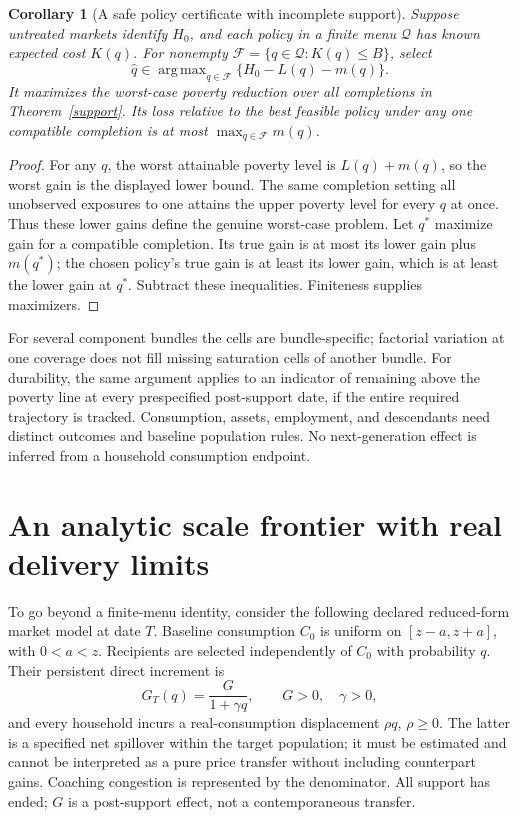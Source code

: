 \documentclass[11pt]{article}
\newtheorem{corollary}[theorem]{Corollary}
\theoremstyle{remark}
\DeclareMathOperator*{\argmax}{arg\,max}
\begin{document}
\begin{corollary}[A safe policy certificate with incomplete support]
Suppose untreated markets identify $H_0$, and each policy in a finite menu $\mathcal Q$ has known expected cost $K(q)$. For nonempty $\mathcal F=\{q\in\mathcal Q:K(q)\leq B\}$, select
\[
 \widehat q\in\argmax_{q\in\mathcal F}\{H_0-L(q)-m(q)\}.
\]
It maximizes the worst-case poverty reduction over all completions in Theorem~\ref{support}. Its loss relative to the best feasible policy under any one compatible completion is at most $\max_{q\in\mathcal F}m(q)$.
\end{corollary}
\begin{proof}
For any $q$, the worst attainable poverty level is $L(q)+m(q)$, so the worst gain is the displayed lower bound. The same completion setting all unobserved exposures to one attains the upper poverty level for every $q$ at once. Thus these lower gains define the genuine worst-case problem. Let $q^*$ maximize gain for a compatible completion. Its true gain is at most its lower gain plus $m(q^*)$; the chosen policy's true gain is at least its lower gain, which is at least the lower gain at $q^*$. Subtract these inequalities. Finiteness supplies maximizers.
\end{proof}

For several component bundles the cells are bundle-specific; factorial variation at one coverage does not fill missing saturation cells of another bundle. For durability, the same argument applies to an indicator of remaining above the poverty line at every prespecified post-support date, if the entire required trajectory is tracked. Consumption, assets, employment, and descendants need distinct outcomes and baseline population rules. No next-generation effect is inferred from a household consumption endpoint.

\section{An analytic scale frontier with real delivery limits}
To go beyond a finite-menu identity, consider the following declared reduced-form market model at date $T$. Baseline consumption $C_0$ is uniform on $[z-a,z+a]$, with $0<a<z$. Recipients are selected independently of $C_0$ with probability $q$. Their persistent direct increment is
\[
 G_T(q)=\frac{G}{1+\gamma q},\qquad G>0,\quad\gamma>0,
\]
and every household incurs a real-consumption displacement $\rho q$, $\rho\geq0$. The latter is a specified net spillover within the target population; it must be estimated and cannot be interpreted as a pure price transfer without including counterpart gains. Coaching congestion is represented by the denominator. All support has ended; $G$ is a post-support effect, not a contemporaneous transfer.
\end{document}
